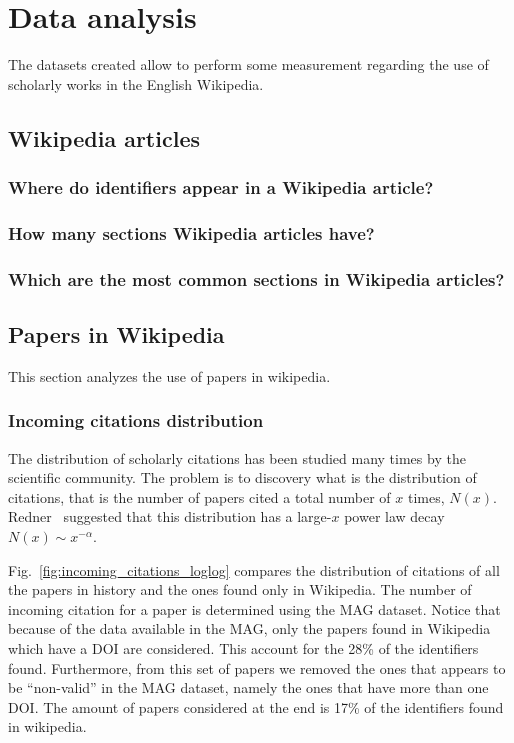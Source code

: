 
\chapter{Data analysis}
\label{cha:data_analysis}
The datasets created allow to perform some measurement regarding the use of scholarly works in the English Wikipedia.

\section{Wikipedia articles}
\subsection{Where do identifiers appear in a Wikipedia article?}

\subsection{How many sections Wikipedia articles have?}

\subsection{Which are the most common sections in Wikipedia articles?}

\section{Papers in Wikipedia}
This section analyzes the use of papers in wikipedia.

\subsection{Incoming citations distribution}
The distribution of scholarly citations has been studied many times by the scientific community.
The problem is to discovery what is the distribution of citations, that is the number of papers cited a total number of $x$ times, $N(x)$.
Redner~\cite{Redner1998} suggested that this distribution has a large-$x$ power law decay $N(x) \sim x^{-\alpha}$.

Fig.~\ref{fig:incoming_citations_loglog} compares the distribution of citations of all the papers in history and the ones found only in Wikipedia.
The number of incoming citation for a paper is determined using the \ac{MAG} dataset.
Notice that because of the data available in the \ac{MAG}, only the papers found in Wikipedia which have a \ac{DOI} are considered.
This account for the 28\% of the identifiers found.
Furthermore, from this set of papers we removed the ones that appears to be ``non-valid'' in the \ac{MAG} dataset, namely the ones that have more than one \ac{DOI}.
The amount of papers considered at the end is 17\% of the identifiers found in wikipedia.

